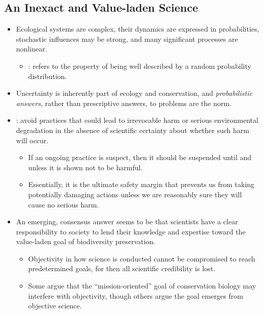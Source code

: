 \documentclass{inVerba-notes}
\begin{document}
\begin{itemize}
    \subsection{An Inexact and Value-laden Science}\label{An Inexact and Value-laden Science}
    \begin{itemize}
        \item  Ecological systems are complex, their dynamics are expressed in probabilities, stochastic influences may be strong, and many significant processes are nonlinear.
            \begin{itemize}
                \item {}: refers to the property of being well described by a random probability distribution.
            \end{itemize}
        \item Uncertainty is inherently part of ecology and conservation, and \emph{probabilistic answers}, rather than prescriptive answers, to problems are the norm.
        \item {}: avoid practices that could lead to irrevocable harm or serious environmental degradation in the absence of scientific certainty about whether such harm will occur. 
            \begin{itemize}
                \item If an ongoing practice is suspect, then it should be suspended until and unless it is shown not to be harmful.
                \item Essentially, it is the ultimate safety margin that prevents us from taking potentially damaging actions unless we are reasonably sure they will cause no serious harm. 
            \end{itemize}
        \item An emerging, consensus answer seems to be that scientists have a clear responsibility to society to lend their knowledge and expertise toward the value-laden goal of biodiversity preservation.
            \begin{itemize}
                \item Objectivity in how science is conducted cannot be compromised to reach predetermined goals, for then all scientific credibility is lost. 
                \item Some argue that the ``mission-oriented'' goal of conservation biology may interfere with objectivity, though others argue the goal emerges from objective science.  
            \end{itemize}
    \end{itemize}
    
    
\end{itemize}
\end{document}
